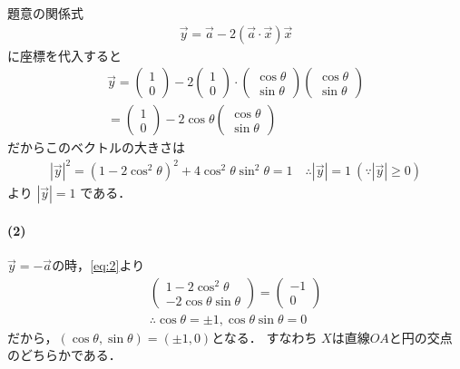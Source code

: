 \documentclass[../../main.tex]{subfiles}
\begin{document}
題意の関係式
\begin{align}
  \vec{y} = \vec{a}-2(\vec{a}\cdot\vec{x})\vec{x} \label{eq:1}
\end{align}
に座標を代入すると
\begin{align}
  \vec{y} =
  \begin{pmatrix} 1 \\ 0
  \end{pmatrix} - 2
  \begin{pmatrix} 1 \\ 0
  \end{pmatrix} \cdot
  \begin{pmatrix} \cos\theta \\ \sin\theta
  \end{pmatrix}
  \begin{pmatrix} \cos\theta \\ \sin\theta
  \end{pmatrix} \\
  =
  \begin{pmatrix} 1 \\ 0
  \end{pmatrix} - 2\cos\theta
  \begin{pmatrix} \cos\theta \\ \sin\theta
  \end{pmatrix} \label{eq:2}
\end{align}
だからこのベクトルの大きさは
\begin{align}
  |\vec{y}|^2
  = (1-2\cos^2\theta)^2 + 4\cos^2\theta\sin^2\theta = 1
  \quad \therefore
  |\vec{y}|=1 \ (\because |\vec{y}| \ge 0)
\end{align}
より $|\vec{y}| = 1$ である．

\paragraph{(2)}

$\vec{y} = -\vec{a}$の時，\cref{eq:2}より
\begin{align}
  \begin{pmatrix} 1-2\cos^2\theta \\ -2\cos\theta\sin\theta
  \end{pmatrix} =
  \begin{pmatrix} -1 \\ 0
  \end{pmatrix} \\
  \therefore \cos\theta=\pm 1, \cos\theta\sin\theta=0
\end{align}
だから，$(\cos\theta,\sin\theta)=(\pm 1,0)$となる．
すなわち $X$は直線$OA$と円の交点のどちらかである．
\end{document}
